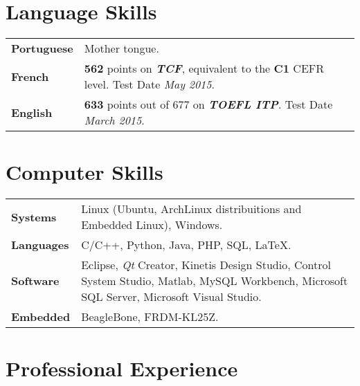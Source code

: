 \documentclass[10pt, a4paper]{article}
\begin{document}


\section{Language Skills}

\begin{tabular}{p{} p{}}

\textbf{Portuguese} & Mother tongue.  \\ 

\textbf{French} & \textbf{562} points on \textbf{\textit{TCF}},
equivalent to the \textbf{C1} CEFR level. Test Date \textit{May 2015}.
\\

\textbf{English} & \textbf{633} points out of 677 on \textbf{\textit{TOEFL
ITP}}. Test Date \textit{March 2015}.
\\

\end{tabular}


\section{Computer Skills}

\begin{tabular}{p{} p{}}

 \textbf{Systems} & Linux (Ubuntu, ArchLinux distribuitions and Embedded Linux),
 Windows.
 \\

 \textbf{Languages} & C/C++, Python, Java, PHP, SQL, \LaTeX.
 \\
 
 \textbf{Software} & Eclipse, \textit{Qt} Creator, Kinetis Design Studio,
 Control System Studio, Matlab, MySQL Workbench, Microsoft SQL Server, Microsoft
 Visual Studio.\\
 
  \textbf{Embedded} & BeagleBone, FRDM-KL25Z. \\
\end{tabular}



\section{Professional Experience}
\end{document}

